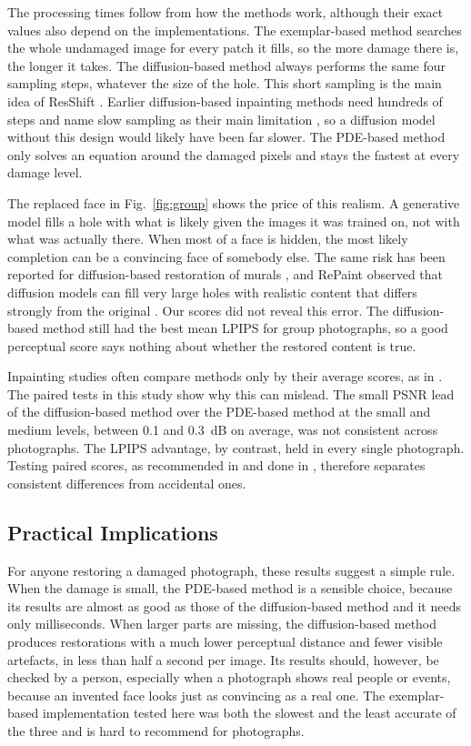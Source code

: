 \documentclass[conference]{IEEEtran}
\begin{document}
The processing times follow from how the methods work, although their exact values also depend on the implementations. The exemplar-based method searches the whole undamaged image for every patch it fills, so the more damage there is, the longer it takes. The diffusion-based method always performs the same four sampling steps, whatever the size of the hole. This short sampling is the main idea of ResShift \cite{yue2025}. Earlier diffusion-based inpainting methods need hundreds of steps and name slow sampling as their main limitation \cite{lugmayr2022repaint}, so a diffusion model without this design would likely have been far slower. The PDE-based method only solves an equation around the damaged pixels and stays the fastest at every damage level.

The replaced face in Fig.~\ref{fig:group} shows the price of this realism. A generative model fills a hole with what is likely given the images it was trained on, not with what was actually there. When most of a face is hidden, the most likely completion can be a convincing face of somebody else. The same risk has been reported for diffusion-based restoration of murals \cite{peng2026dcadif}, and RePaint observed that diffusion models can fill very large holes with realistic content that differs strongly from the original \cite{lugmayr2022repaint}. Our scores did not reveal this error. The diffusion-based method still had the best mean LPIPS for group photographs, so a good perceptual score says nothing about whether the restored content is true.

Inpainting studies often compare methods only by their average scores, as in \cite{jiang2025,sumathi2024}. The paired tests in this study show why this can mislead. The small PSNR lead of the diffusion-based method over the PDE-based method at the small and medium levels, between 0.1 and 0.3~dB on average, was not consistent across photographs. The LPIPS advantage, by contrast, held in every single photograph. Testing paired scores, as recommended in \cite{rainio2024} and done in \cite{chung2026}, therefore separates consistent differences from accidental ones.

\subsection*{Practical Implications}

For anyone restoring a damaged photograph, these results suggest a simple rule. When the damage is small, the PDE-based method is a sensible choice, because its results are almost as good as those of the diffusion-based method and it needs only milliseconds. When larger parts are missing, the diffusion-based method produces restorations with a much lower perceptual distance and fewer visible artefacts, in less than half a second per image. Its results should, however, be checked by a person, especially when a photograph shows real people or events, because an invented face looks just as convincing as a real one. The exemplar-based implementation tested here was both the slowest and the least accurate of the three and is hard to recommend for photographs.
\end{document}
